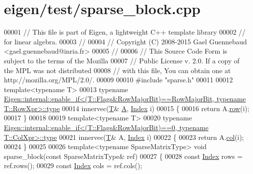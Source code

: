 \hypertarget{eigen_2test_2sparse__block_8cpp_source}{}\section{eigen/test/sparse\+\_\+block.cpp}
\label{eigen_2test_2sparse__block_8cpp_source}

\begin{DoxyCode}
00001 \textcolor{comment}{// This file is part of Eigen, a lightweight C++ template library}
00002 \textcolor{comment}{// for linear algebra.}
00003 \textcolor{comment}{//}
00004 \textcolor{comment}{// Copyright (C) 2008-2015 Gael Guennebaud <gael.guennebaud@inria.fr>}
00005 \textcolor{comment}{//}
00006 \textcolor{comment}{// This Source Code Form is subject to the terms of the Mozilla}
00007 \textcolor{comment}{// Public License v. 2.0. If a copy of the MPL was not distributed}
00008 \textcolor{comment}{// with this file, You can obtain one at http://mozilla.org/MPL/2.0/.}
00009 
00010 \textcolor{preprocessor}{#include "sparse.h"}
00011 
00012 \textcolor{keyword}{template}<\textcolor{keyword}{typename} T>
00013 \textcolor{keyword}{typename} 
      \hyperlink{struct_eigen_1_1internal_1_1enable__if}{Eigen::internal::enable\_if<(T::Flags&RowMajorBit)==RowMajorBit, typename T::RowXpr>::type}
00014 innervec(\hyperlink{group___sparse_core___module}{T}& \hyperlink{group___core___module_class_eigen_1_1_matrix}{A}, \hyperlink{namespace_eigen_a62e77e0933482dafde8fe197d9a2cfde}{Index} i)
00015 \{
00016   \textcolor{keywordflow}{return} A.\hyperlink{group___sparse_core___module_ae88b0ad6d31daa53e298b9cc4201fdee}{row}(i);
00017 \}
00018 
00019 \textcolor{keyword}{template}<\textcolor{keyword}{typename} T>
00020 \textcolor{keyword}{typename} 
      \hyperlink{struct_eigen_1_1internal_1_1enable__if}{Eigen::internal::enable\_if<(T::Flags&RowMajorBit)==0, typename T::ColXpr>::type}
00021 innervec(\hyperlink{group___sparse_core___module}{T}& A, \hyperlink{namespace_eigen_a62e77e0933482dafde8fe197d9a2cfde}{Index} i)
00022 \{
00023   \textcolor{keywordflow}{return} A.\hyperlink{group___sparse_core___module_a3531e3e2098507a069a368d72d46471e}{col}(i);
00024 \}
00025 
00026 \textcolor{keyword}{template}<\textcolor{keyword}{typename} SparseMatrixType> \textcolor{keywordtype}{void} sparse\_block(\textcolor{keyword}{const} SparseMatrixType& ref)
00027 \{
00028   \textcolor{keyword}{const} \hyperlink{namespace_eigen_a62e77e0933482dafde8fe197d9a2cfde}{Index} rows = ref.rows();
00029   \textcolor{keyword}{const} \hyperlink{namespace_eigen_a62e77e0933482dafde8fe197d9a2cfde}{Index} cols = ref.cols();

\end{DoxyCode}
